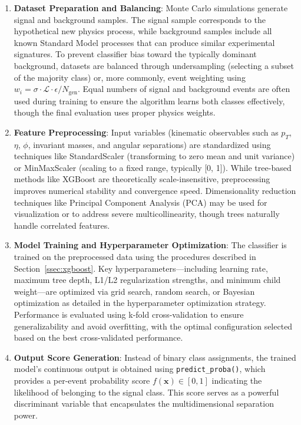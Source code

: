 \begin{enumerate}
    \item \textbf{Dataset Preparation and Balancing}: Monte Carlo simulations generate signal and background samples. The signal sample corresponds to the hypothetical new physics process, while background samples include all known Standard Model processes that can produce similar experimental signatures. To prevent classifier bias toward the typically dominant background, datasets are balanced through undersampling (selecting a subset of the majority class) or, more commonly, event weighting using $w_i = \sigma \cdot \mathcal{L} \cdot \epsilon / N_{\text{gen}}$. Equal numbers of signal and background events are often used during training to ensure the algorithm learns both classes effectively, though the final evaluation uses proper physics weights.
    
    \item \textbf{Feature Preprocessing}: Input variables (kinematic observables such as $p_T$, $\eta$, $\phi$, invariant masses, and angular separations) are standardized using techniques like StandardScaler (transforming to zero mean and unit variance) or MinMaxScaler (scaling to a fixed range, typically [0, 1]). While tree-based methods like XGBoost are theoretically scale-insensitive, preprocessing improves numerical stability and convergence speed. Dimensionality reduction techniques like Principal Component Analysis (PCA) may be used for visualization or to address severe multicollinearity, though trees naturally handle correlated features.
    
    \item \textbf{Model Training and Hyperparameter Optimization}: The classifier is trained on the preprocessed data using the procedures described in Section~\ref{ssec:xgboost}. Key hyperparameters—including learning rate, maximum tree depth, L1/L2 regularization strengths, and minimum child weight—are optimized via grid search, random search, or Bayesian optimization as detailed in the hyperparameter optimization strategy. Performance is evaluated using k-fold cross-validation to ensure generalizability and avoid overfitting, with the optimal configuration selected based on the best cross-validated performance.
    
    \item \textbf{Output Score Generation}: Instead of binary class assignments, the trained model's continuous output is obtained using \texttt{predict\_proba()}, which provides a per-event probability score $f(\mathbf{x}) \in [0, 1]$ indicating the likelihood of belonging to the signal class. This score serves as a powerful discriminant variable that encapsulates the multidimensional separation power.
    

\end{enumerate}
